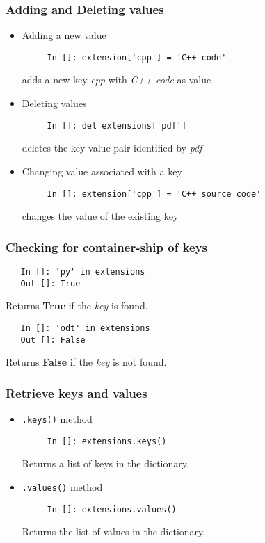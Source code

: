 \documentclass[presentation]{beamer}
\begin{document}
\begin{frame}[fragile]
\frametitle{Adding and Deleting values}
\label{sec-5}

\begin{itemize}
\item Adding a new value
\begin{verbatim}
     In []: extension['cpp'] = 'C++ code'
\end{verbatim}

    adds a new key \emph{cpp} with \emph{C++ code} as value
\item Deleting values
\begin{verbatim}
     In []: del extensions['pdf']
\end{verbatim}

    deletes the key-value pair identified by \emph{pdf}
\item Changing value associated with a key
\begin{verbatim}
     In []: extension['cpp'] = 'C++ source code'
\end{verbatim}

    changes the value of the existing key
\end{itemize}
\end{frame}
\begin{frame}[fragile]
\frametitle{Checking for container-ship of keys}
\label{sec-6}

\begin{verbatim}
   In []: 'py' in extensions
   Out []: True
\end{verbatim}

  Returns \textbf{True} if the \emph{key} is found.
\begin{verbatim}
   In []: 'odt' in extensions
   Out []: False
\end{verbatim}

  Returns \textbf{False} if the \emph{key} is not found.
\end{frame}
\begin{frame}[fragile]
\frametitle{Retrieve keys and values}
\label{sec-7}

\begin{itemize}
\item \texttt{.keys()} method
\begin{verbatim}
     In []: extensions.keys()
\end{verbatim}

    Returns a list of keys in the dictionary.
\item \texttt{.values()} method
\begin{verbatim}
     In []: extensions.values()
\end{verbatim}

    Returns the list of values in the dictionary.
\end{itemize}
\end{frame}
\end{document}
